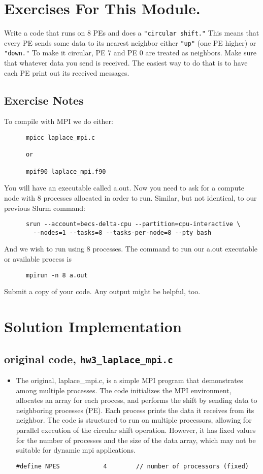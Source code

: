 \documentclass[11pt]{article}
\begin{document}
\section{Exercises For This Module.}
Write a code that runs on 8 PEs and does a \texttt{"circular shift."} This means that every PE sends some data to its nearest neighbor either \texttt{"up"} (one PE higher) or \texttt{"down."} To make it circular, PE 7 and PE 0 are treated as neighbors. Make sure that whatever data you send is received. The easiest way to do that is to have each PE print out its received messages.


\subsection{Exercise Notes}

  To compile with MPI we do either:

    \begin{verbatim}
      mpicc laplace_mpi.c
      
      or
      
      mpif90 laplace_mpi.f90
    \end{verbatim}
  You will have an executable called a.out. Now you need to ask for a compute node with 8 processes allocated in order to run. Similar, but not identical, to our previous Slurm command:
    \begin{verbatim}
      srun --account=becs-delta-cpu --partition=cpu-interactive \
        --nodes=1 --tasks=8 --tasks-per-node=8 --pty bash
    \end{verbatim}
  And we wish to run using 8 processes. The command to run our a.out executable or available process is
    \begin{verbatim}
      mpirun -n 8 a.out
    \end{verbatim}
  Submit a copy of your code. Any output might be helpful, too.


\section{Solution Implementation}
  \subsection{original code, \texttt{hw3\_laplace\_mpi.c}}
    \begin{itemize}
    \item{The original, laplace\_mpi.c, is a simple MPI program that demonstrates among multiple processes. The code initializes the MPI environment, allocates an array for each process, and performs the shift by sending data to neighboring processes (PE). Each process prints the data it receives from its neighbor. The code is structured to run on multiple processors, allowing for parallel execution of the circular shift operation. However, it has fixed values for the number of processes and the size of the data array, which may not be suitable for dynamic mpi applications.}
      \begin{lstlisting}[style=dm4ds_lstCustom_01]
        #define NPES            4        // number of processors (fixed)
      \end{lstlisting}
    \end{itemize}
\end{document}
